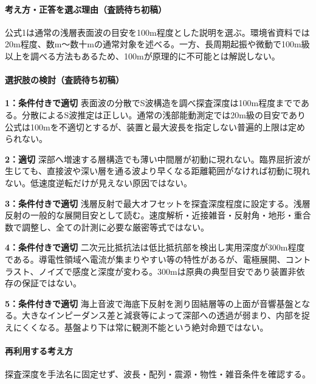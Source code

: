\paragraph{考え方・正答を選ぶ理由（査読待ち初稿）} 公式1は通常の浅層表面波の目安を100m程度とした説明を選ぶ。環境省資料では20m程度、数m〜数十mの通常対象を述べる。一方、長周期起振や微動で100m級以上を調べる方法もあるため、100mが原理的に不可能とは解説しない。

\paragraph{選択肢の検討（査読待ち初稿）}\mbox{}\par

\noindent\textbf{1：条件付きで適切} 表面波の分散でS波構造を調べ探査深度は100m程度までである。分散によるS波推定は正しい。通常の浅部能動測定では20m級の目安であり公式は100mを不適切とするが、装置と最大波長を指定しない普遍的上限は定められない。\par

\noindent\textbf{2：適切} 深部へ増速する層構造でも薄い中間層が初動に現れない。臨界屈折波が生じても、直接波や深い層を通る波より早くなる距離範囲がなければ初動に現れない。低速度逆転だけが見えない原因ではない。\par

\noindent\textbf{3：条件付きで適切} 浅層反射で最大オフセットを探査深度程度に設定する。浅層反射の一般的な展開目安として読む。速度解析・近接雑音・反射角・地形・重合数で調整し、全ての計測に必要な厳密等式ではない。\par

\noindent\textbf{4：条件付きで適切} 二次元比抵抗法は低比抵抗部を検出し実用深度が300m程度である。導電性領域へ電流が集まりやすい等の特性があるが、電極展開、コントラスト、ノイズで感度と深度が変わる。300mは原典の典型目安であり装置非依存の保証ではない。\par

\noindent\textbf{5：条件付きで適切} 海上音波で海底下反射を測り固結層等の上面が音響基盤となる。大きなインピーダンス差と減衰等によって深部への透過が弱まり、内部を捉えにくくなる。基盤より下は常に観測不能という絶対命題ではない。\par

\paragraph{再利用する考え方} 探査深度を手法名に固定せず、波長・配列・震源・物性・雑音条件を確認する。

